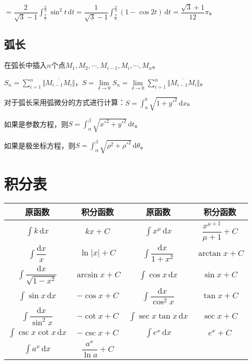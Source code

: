\documentclass[UTF8, 12pt]{ctexart}
\begin{document}
$=\dfrac{2}{\sqrt{3}-1}\int_\frac{\pi}{6}^\frac{\pi}{3}\sin^2t\,\textrm{d}t=\dfrac{1}{\sqrt{3}-1}\int_\frac{\pi}{6}^\frac{\pi}{3}(1-\cos2t)\,\textrm{d}t=\dfrac{\sqrt{3}+1}{12}\pi$。

\subsection{弧长}

在弧长中插入$n$个点$M_1,M_2,\cdots,M_{i-1},M_i,\cdots,M_n$。

$S_n=\sum\limits_{i=1}^n\Vert\overline{M_{i-1}M_{i}}\Vert$，$S=\lim\limits_{\delta\to 0}S_n=\lim\limits_{\delta\to 0}\sum\limits_{i=1}^n\Vert\overline{M_{i-1}M_{i}}\Vert$。

对于弧长采用弧微分的方式进行计算：$S=\int_a^b\sqrt{1+y'^2}\,\textrm{d}x$。

如果是参数方程，则$S=\int_\alpha^\beta\sqrt{x'^2+y'^2}\,\textrm{d}t$。

如果是极坐标方程，则$S=\int_\alpha^\beta\sqrt{\rho^2+\rho'^2}\,\textrm{d}\theta$。

\section{积分表}

\begin{center}
    \begin{tabular}{|c|c|c|c|}
        \hline
        原函数 & 积分函数 & 原函数 & 积分函数\\ \hline
        $\int k\,\textrm{d}x$ & $kx+C$ & $\int x^\mu\,\textrm{d}x$ & $\dfrac{x^{\mu+1}}{\mu+1}+C$ \\ \hline
        $\int\dfrac{\textrm{d}x}{x}$ & $\ln\vert x\vert+C$ & $\int\dfrac{\textrm{d}x}{1+x^2}$ & $\arctan x+C$ \\ \hline
        $\int\dfrac{\textrm{d}x}{\sqrt{1-x^2}}$ & $\arcsin x+C$ & $\int\cos x\,\textrm{d}x$ & $\sin x+C$ \\ \hline
        $\int\sin x\,\textrm{d}x$ & $-\cos x+C$ & $\int\dfrac{\textrm{d}x}{\cos^2x}$ & $\tan x+C$ \\ \hline
        $\int\dfrac{\textrm{d}x}{\sin^2x}$ & $-\cot x+C$ & $\int\sec x\tan x\,\textrm{d}x$ & $\sec x+C$ \\ \hline
        $\int\csc x\cot x\,\textrm{d}x$ & $-\csc x+C$ & $\int e^x\,\textrm{d}x$ & $e^x+C$ \\ \hline
        $\int a^x\,\textrm{d}x$ & $\dfrac{a^x}{\ln a}+C$ & & \\
        \hline
    \end{tabular}
\end{center}
\end{document}
